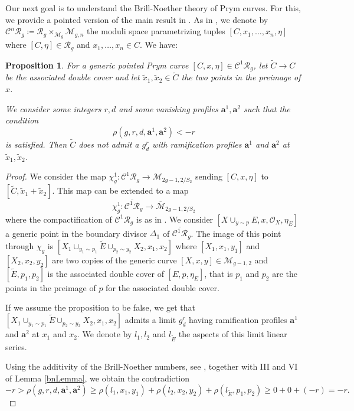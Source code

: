 \documentclass{article}
\theoremstyle{plain}
\newtheorem{prop}[trm]{Proposition}
\theoremstyle{definition}
\def\OO{\mathcal{O}}
\def\cM{\mathcal{M}}
\def\cR{\mathcal{R}}
\def\mm{\overline{\mathcal{M}}}
\begin{document}
Our next goal is to understand the Brill-Noether theory of Prym curves. For this, we provide a pointed version of the main result in \cite{SchwarzPrym}. As in \cite{BudKodPrym}, we denote by $\mathcal{C}^n\mathcal{R}_g\coloneqq \mathcal{R}_g\times_{\mathcal{M}_g}\cM_{g,n}$ the moduli space parametrizing tuples $[C,x_1,\ldots,x_n, \eta]$ where $[C, \eta] \in \mathcal{R}_g$ and $x_1, \ldots, x_n \in C$. We have:
\begin{prop} \label{pointedSchwarz}
	For a generic pointed Prym curve $[C,x,\eta] \in \mathcal{C}^1\mathcal{R}_g$, let $\widetilde{C}\rightarrow C$ be the associated double cover and let $\widetilde{x}_1,\widetilde{x}_2 \in \widetilde{C}$ the two points in the preimage of $x$.   
	
	We consider some integers $r, d$ and some vanishing profiles $\textbf{a}^1, \textbf{a}^2$ such that the condition 
	\[\rho(g,r,d,\textbf{a}^1, \textbf{a}^2) <-r\] 
	is satisfied. Then $\widetilde{C}$ does not admit a $g^r_d$ with ramification profiles $\textbf{a}^1$ and $\textbf{a}^2$ at $\widetilde{x}_1,\widetilde{x}_2$.    
\end{prop}
\begin{proof} We consider the map $\chi^1_g\colon \mathcal{C}^1\mathcal{R}_g \rightarrow \cM_{2g-1,2/S_2}$ sending $[C,x,\eta]$ to $[\widetilde{C},\widetilde{x}_1+\widetilde{x}_2]$. This map can be extended to a map 
	\[ \chi^1_g\colon \overline{\mathcal{C}^1\cR}_g\rightarrow \mm_{2g-1,2/S_2} \]
where the compactification of $\mathcal{C}^1\mathcal{R}_g$ is as in \cite[Section 6]{BudKodPrym}. We consider $[X\cup_{y\sim p}E, x, \OO_X, \eta_E]$ a generic point in the boundary divisor $\Delta_1$ of $\overline{\mathcal{C}^1\cR}_g$. The image of this point through $\chi_g$ is $[X_1\cup_{y_1\sim p_1} \widetilde{E} \cup_{p_2\sim y_2} X_2, x_1, x_2]$ where $[X_1, x_1, y_1]$ and $[X_2, x_2, y_2]$ are two copies of the generic curve $[X,x,y] \in \cM_{g-1,2}$ and $[\widetilde{E},p_1,p_2]$ is the associated double cover of $[E,p,\eta_E]$, that is $p_1$ and $p_2$ are the points in the preimage of $p$ for the associated double cover. 

If we assume the proposition to be false, we get that $[X_1\cup_{y_1\sim p_1} \widetilde{E} \cup_{p_2\sim y_2} X_2, x_1, x_2]$ admits a limit $g^r_d$ having ramification profiles $\textbf{a}^1$ and $\textbf{a}^2$ at $x_1$ and $x_2$. We denote by $l_1, l_2$ and $l_{\widetilde{E}}$ the aspects of this limit linear series. 

Using the additivity of the Brill-Noether numbers, see \cite[Proposition 4.6]{limitlinearbasic}, together with III and VI of Lemma \ref{bnLemma}, we obtain the contradiction 
\[ -r>\rho(g,r,d,\textbf{a}^1,\textbf{a}^2) \geq \rho(l_1,x_1,y_1) + \rho(l_2,x_2,y_2) + \rho(l_{\widetilde{E}},p_1,p_2) \geq   0+0+(-r) = -r.\]
\end{proof}
\end{document}
